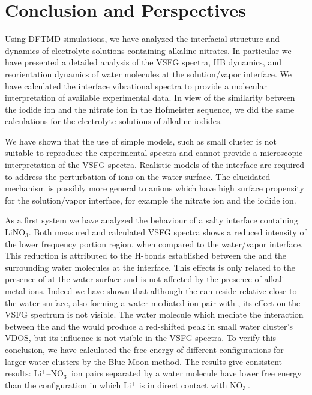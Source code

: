 \chapter{Conclusion and Perspectives}\label{CHAPTER_Summary}
Using DFTMD simulations, we have analyzed the interfacial structure and dynamics of electrolyte solutions containing alkaline nitrates.
In particular we have presented a detailed analysis of the VSFG spectra, HB dynamics, and reorientation dynamics of water molecules at the solution/vapor interface. 
We have calculated the interface vibrational spectra to provide a molecular interpretation of available experimental data. 
In view of the similarity between the iodide ion and the nitrate ion in the Hofmeister sequence, 
we did the same calculations for the electrolyte solutions of alkaline iodides. 

We have shown that the use of simple models, such as small cluster is not suitable to reproduce the experimental spectra 
and cannot provide a microscopic interpretation of the VSFG spectra. Realistic models of the interface are required to address the 
perturbation of ions on the water surface. The elucidated mechanism is possibly more general to anions which have high 
surface propensity for the solution/vapor interface, for example the nitrate ion and the iodide ion.

As a first system we have analyzed the behaviour of a salty interface containing LiNO$_3$.
Both measured and calculated VSFG spectra shows a reduced intensity of the lower frequency portion region, 
when compared to the water/vapor interface. 
This reduction is attributed to the H-bonds established between the \nitrate and the surrounding water molecules at the interface.
This effects is only related to the presence of \nitrate at the water surface and is not affected by the presence of alkali metal ions.
Indeed we have shown that although the \Li can reside relative close to the water surface, also forming a water mediated
ion pair with \nit, its effect on the VSFG spectrum is not visible. The water molecule which mediate the interaction 
between the \nitrate and the \Li would produce a red-shifted peak in small water cluster's VDOS, but its influence is not visible 
in the VSFG spectra. To verify this conclusion, we have calculated the free energy of different configurations for 
larger water clusters by the Blue-Moon method. The results give consistent results: Li$^+$--NO$_3^-$ ion pairs 
separated by a water molecule have lower free energy than the configuration in which Li$^+$ is in direct contact with NO$_3^-$. 

